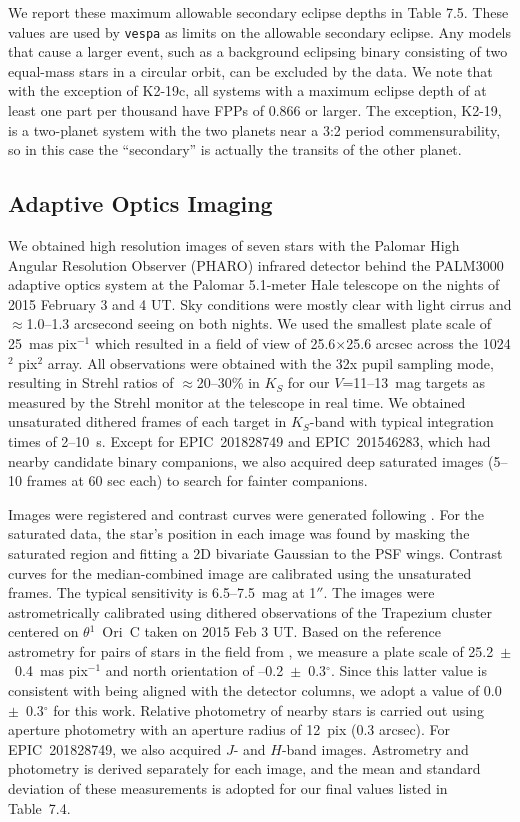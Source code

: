 We report these maximum allowable secondary eclipse depths in Table 7.5.
These values are used by \texttt{vespa} as limits on the allowable secondary eclipse.
Any models that cause a larger event, such as a background eclipsing binary
consisting of two equal-mass stars in a circular orbit, can be excluded by the data.
We note that with the exception of K2-19c, all systems with a maximum
eclipse depth of at least one part per thousand have FPPs of 0.866 or larger.
The exception, K2-19, is a two-planet system with the two planets near a 3:2 period
commensurability, so in this case the ``secondary'' is actually the transits of the
other planet.


\subsection{Adaptive Optics Imaging}
\label{sec:AO}

We obtained high resolution images of seven stars with the
Palomar High Angular Resolution Observer (PHARO) infrared detector
\citep{Hayward01} behind the PALM3000 adaptive optics system \citep{Dekany13}
at the Palomar 5.1-meter Hale telescope on the nights of 2015 February 3 and 4 UT.
Sky conditions were mostly clear with light cirrus and $\approx$1.0--1.3 arcsecond seeing
on both nights.
We used the smallest plate scale of 25~mas pix$^{-1}$ which resulted
in a field of view of 25.6$\times$25.6 arcsec across the 1024$^{2}$ pix$^{2}$ array.
All observations were obtained with the 32x pupil sampling mode, resulting in Strehl ratios
of $\approx$20--30\% in $K_S$ for our $V$=11--13~mag targets as measured by the Strehl
monitor at the telescope in real time.
We obtained unsaturated dithered frames of each target in $K_S$-band with typical
integration times of 2--10~s.
Except for EPIC~201828749 and EPIC~201546283, which had nearby candidate
binary companions, we also
acquired deep saturated images (5--10 frames at 60 sec each)
to search for fainter companions.

Images were registered and contrast curves were generated following \citet{Bowler15a}.
For the saturated data, the star's position in each image was found by masking the
saturated region and fitting a 2D bivariate Gaussian to the PSF wings.
Contrast
curves for the median-combined image are calibrated using the unsaturated frames.
The typical sensitivity is 6.5--7.5~mag at 1$''$.
The images were astrometrically calibrated using dithered observations of the
Trapezium cluster centered
on $\theta$$^1$~Ori~C taken on 2015 Feb 3 UT.
Based on the reference astrometry for pairs of stars in the field from
\citet{McCaughrean94}, we measure a plate scale of 25.2~$\pm$~0.4~mas pix$^{-1}$
and north orientation of --0.2~$\pm$~0.3$^{\circ}$.
Since this latter value is consistent with being aligned with
the detector columns, we adopt a value of 0.0~$\pm$~0.3$^{\circ}$ for this work.
Relative photometry of nearby stars is carried out using aperture photometry with
an aperture radius of 12~pix (0.3 arcsec).
For EPIC~201828749, we also acquired $J$- and $H$-band images.
Astrometry and photometry is derived separately for each image, and the mean and standard deviation
of these measurements is adopted for our final values listed in Table~7.4.


